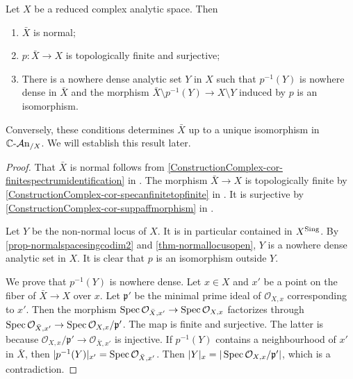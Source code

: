 \begin{proposition}\label{prop-reducedspacenormalizationchar}
    Let $X$ be a reduced complex analytic space. Then 
    \begin{enumerate}
        \item $\bar{X}$ is normal;
        \item $p:\bar{X}\rightarrow X$ is topologically finite and surjective;
        \item There is a nowhere dense analytic set $Y$ in $X$ such that $p^{-1}(Y)$ is nowhere dense in $\bar{X}$ and the morphism $\bar{X}\setminus p^{-1}(Y)\rightarrow X\setminus Y$ induced by $p$ is an isomorphism.
    \end{enumerate}
\end{proposition}

Conversely, these conditions determines $\bar{X}$ up to a unique isomorphism in $\mathbb{C}\text{-}\mathcal{A}\mathrm{n}_{/X}$. We will establish this result later.

\begin{proof}
    That $\bar{X}$ is normal follows from \cref{ConstructionComplex-cor-finitespectrumidentification} in .
    The morphism $\bar{X}\rightarrow X$ is topologically finite by \cref{ConstructionComplex-cor-specanfinitetopfinite} in . It is surjective by \cref{ConstructionComplex-cor-suppaffmorphism} in .

    Let $Y$ be the non-normal locus of $X$. It is in particular contained in $X^{\operatorname{Sing}}$. By \cref{prop-normalspacesingcodim2} and \cref{thm-normallocusopen}, $Y$ is a nowhere dense analytic set in $X$. It is clear that $p$ is an isomorphism outside $Y$. 
    
    We prove that $p^{-1}(Y)$ is nowhere dense. Let $x\in X$ and $x'$ be a point on the fiber of $\bar{X}\rightarrow X$ over $x$. Let $\mathfrak{p}'$ be the minimal prime ideal of $\mathcal{O}_{X,x}$ corresponding to $x'$. Then the morphism $\operatorname{Spec} \mathcal{O}_{\bar{X},x'}\rightarrow \operatorname{Spec} \mathcal{O}_{X,x}$ factorizes through $\operatorname{Spec} \mathcal{O}_{\bar{X},x'}\rightarrow \operatorname{Spec} \mathcal{O}_{X,x}/\mathfrak{p}'$. The map is finite and surjective. The latter is because $\mathcal{O}_{X,x}/\mathfrak{p}'\rightarrow \mathcal{O}_{\bar{X},x'}$ is injective. If $p^{-1}(Y)$ contains a neighbourhood of $x'$ in $\bar{X}$, then $|p^{-1}(Y)|_{x'}=\operatorname{Spec} \mathcal{O}_{\bar{X},x'}$. Then $|Y|_x=|\operatorname{Spec} \mathcal{O}_{X,x}/\mathfrak{p}'|$, which is a contradiction.

\end{proof}



